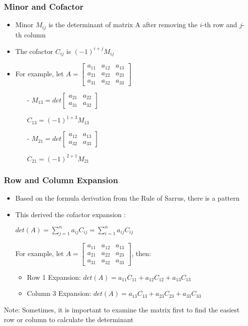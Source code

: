 \documentclass[a4paper,12pt]{article}
\begin{document}
\subsubsection*{Minor and Cofactor}
\begin{itemize}
  \item Minor \(M_{ij}\) is the determinant of matrix A after removing the \(i\)-th row and \(j\)-th column
  \item The cofactor \(C_{ij}\) is \((-1)^{i+j}M_{ij}\)
  \item For example, let \(A=\begin{bmatrix}
          a_{11} & a_{12} & a_{13} \\ a_{21} & a_{22} & a_{23} \\ a_{31} & a_{32} & a_{33}
        \end{bmatrix}\)
        \begin{itemize}
          \item[-] \(M_{13}=det\begin{bmatrix}
              a_{21} & a_{22} \\ a_{31} & a_{32}
            \end{bmatrix}\)
          \item[] \(C_{13}=(-1)^{1+3}M_{13}\)
          \item[-] \(M_{21}=det\begin{bmatrix}
              a_{12} & a_{13} \\ a_{32} & a_{33}
            \end{bmatrix}\)
          \item[] \(C_{21}=(-1)^{2+1}M_{21}\)
        \end{itemize}
\end{itemize}
\subsubsection*{Row and Column Expansion}
\begin{itemize}
  \item Based on the formula derivation from the Rule of Sarrus, there is a pattern
  \item This derived the cofactor expansion : \begin{center}
          \(det(A) = \sum\limits_{j=1}^{n} a_{ij}C_{ij} = \sum\limits_{i=1}^{n} a_{ij}C_{ij}\)
        \end{center}
  \item[] For example, let \(A=\begin{bmatrix}
      a_{11} & a_{12} & a_{13} \\ a_{21} & a_{22} & a_{23} \\ a_{31} & a_{32} & a_{33}
    \end{bmatrix}\), then:
    \begin{itemize}
      \item Row 1 Expansion: \(det(A) = a_{11}C_{11}+a_{12}C_{12}+a_{13}C_{13}\)
      \item Column 3 Expansion: \(det(A) = a_{13}C_{13}+a_{23}C_{23}+a_{33}C_{33}\)
    \end{itemize}
\end{itemize}
Note: Sometimes, it is important to examine the matrix first to find the easiest row or column to calculate the determinant
\end{document}

